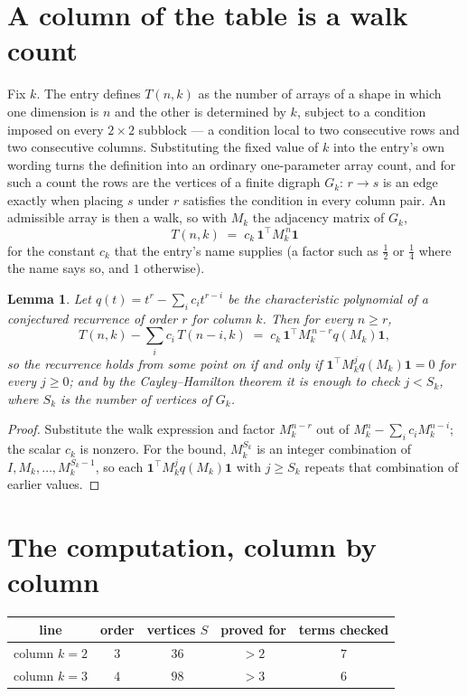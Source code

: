 \documentclass[11pt,a4paper]{article}
\theoremstyle{plain}
\newtheorem{lemma}[theorem]{Lemma}
\theoremstyle{definition}
\begin{document}
\section{A column of the table is a walk count}

Fix $k$. The entry defines $T(n,k)$ as the number of arrays of a shape in which one dimension
is $n$ and the other is determined by $k$, subject to a condition imposed on every
$2\times2$ subblock --- a condition local to two consecutive rows and two consecutive columns.
Substituting the fixed value of $k$ into the entry's own wording turns the definition into an
ordinary one-parameter array count, and for such a count the rows are the vertices of a finite
digraph $G_k$: $r\to s$ is an edge exactly when placing $s$ under $r$ satisfies the condition
in every column pair. An admissible array is then a walk, so with $M_k$ the adjacency matrix
of $G_k$,
\[
T(n,k)\;=\;c_k\,\mathbf{1}^{\!\top}M_k^{\,n}\mathbf{1}
\]
for the constant $c_k$ that the entry's name supplies (a factor such as $\tfrac12$ or
$\tfrac14$ where the name says so, and $1$ otherwise).

\begin{lemma}\label{lem:crit}
Let $q(t)=t^{r}-\sum_i c_it^{r-i}$ be the characteristic polynomial of a conjectured
recurrence of order $r$ for column $k$. Then for every $n\ge r$,
\[
T(n,k)-\sum_i c_i\,T(n-i,k)\;=\;c_k\,\mathbf{1}^{\!\top}M_k^{\,n-r}q(M_k)\mathbf{1},
\]
so the recurrence holds from some point on if and only if
$\mathbf{1}^{\!\top}M_k^{j}q(M_k)\mathbf{1}=0$ for every $j\ge0$; and by the
Cayley--Hamilton theorem it is enough to check $j<S_k$, where $S_k$ is the number of vertices
of $G_k$.
\end{lemma}

\begin{proof}
Substitute the walk expression and factor $M_k^{n-r}$ out of $M_k^{n}-\sum_ic_iM_k^{n-i}$;
the scalar $c_k$ is nonzero. For the bound, $M_k^{S_k}$ is an integer combination of
$I,M_k,\dots,M_k^{S_k-1}$, so each $\mathbf{1}^{\!\top}M_k^{j}q(M_k)\mathbf{1}$ with
$j\ge S_k$ repeats that combination of earlier values.
\end{proof}

\section{The computation, column by column}

\begin{center}
\begin{tabular}{ccccc}
line & order & vertices $S$ & proved for & terms checked \\ \hline
column $k$$=2$ & $3$ & $36$ & $>2$ & $7$ \\
column $k$$=3$ & $4$ & $98$ & $>3$ & $6$ \\
\end{tabular}
\end{center}
\end{document}
